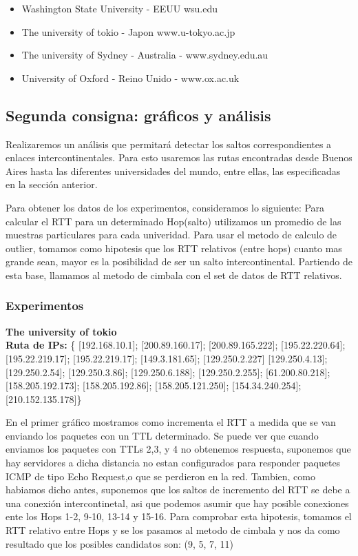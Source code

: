 \begin{itemize}
\item Washington State University - EEUU wsu.edu
\item The university of tokio - Japon www.u-tokyo.ac.jp
\item The university of Sydney - Australia - www.sydney.edu.au
\item University of Oxford - Reino Unido - www.ox.ac.uk

\end{itemize}

\subsection{Segunda consigna: gráficos y análisis}


Realizaremos un análisis que permitará detectar los saltos correspondientes a enlaces intercontinentales. Para esto usaremos las rutas encontradas desde Buenos Aires hasta las diferentes universidades del mundo, entre ellas, las especificadas en la sección anterior. 

Para obtener los datos de los experimentos, consideramos lo siguiente:
Para calcular el RTT para un determinado Hop(salto) utilizamos un promedio de las muestras particulares para cada univeridad.
Para usar el metodo de calculo de outlier, tomamos como hipotesis que los RTT relativos (entre hops) cuanto mas grande sean, mayor es la posibilidad de ser un salto intercontinental. Partiendo de esta base, llamamos al metodo de cimbala con el set de datos de RTT relativos.

\subsubsection{Experimentos}
\textbf{The university of tokio} \\

\textbf{Ruta de IPs:} \{ [192.168.10.1]; [200.89.160.17]; [200.89.165.222]; 
 [195.22.220.64]; [195.22.219.17]; [195.22.219.17]; [149.3.181.65]; [129.250.2.227] 
 [129.250.4.13]; [129.250.2.54]; [129.250.3.86]; [129.250.6.188]; [129.250.2.255]; 
 [61.200.80.218]; [158.205.192.173]; [158.205.192.86]; [158.205.121.250]; 
 [154.34.240.254]; [210.152.135.178]\}

En el primer gráfico mostramos como incrementa el RTT a medida que se van enviando los paquetes con un TTL determinado. Se puede ver que cuando enviamos los paquetes con TTLs 2,3, y 4 no obtenemos respuesta, suponemos que hay servidores a dicha distancia no estan configurados para responder paquetes ICMP de tipo Echo Request,o que se perdieron en la red. Tambien, como habiamos dicho antes, suponemos que los saltos de incremento del RTT se debe a una conexión intercontinetal, asi que podemos asumir que hay posible conexiones ente los Hops 1-2, 9-10, 13-14 y 15-16.
Para comprobar esta hipotesis, tomamos el RTT relativo entre Hops y se los pasamos al metodo de cimbala y nos da como resultado que los posibles candidatos son:
(9, 5, 7, 11)


